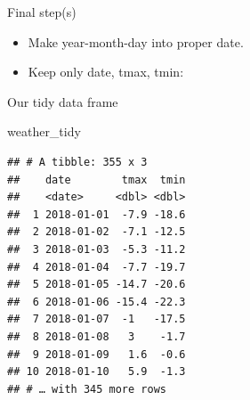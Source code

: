 \documentclass[
  ignorenonframetext,
]{beamer}
\newenvironment{Shaded}{\begin{snugshade}}{\end{snugshade}}
\newcommand{\DataTypeTok}[1]{\textcolor[rgb]{0.13,0.29,0.53}{#1}}
\newcommand{\KeywordTok}[1]{\textcolor[rgb]{0.13,0.29,0.53}{\textbf{#1}}}
\newcommand{\NormalTok}[1]{#1}
\newcommand{\OperatorTok}[1]{\textcolor[rgb]{0.81,0.36,0.00}{\textbf{#1}}}
\newcommand{\StringTok}[1]{\textcolor[rgb]{0.31,0.60,0.02}{#1}}
\providecommand{\tightlist}{%
  \setlength{\itemsep}{0pt}\setlength{\parskip}{0pt}}
\begin{document}
\begin{frame}[fragile]{Final step(s)}
\protect\hypertarget{final-steps}{}

\begin{itemize}
\tightlist
\item
  Make year-month-day into proper date.
\item
  Keep only date, tmax, tmin: \small
\end{itemize}

\begin{Shaded}
\end{Shaded}

\normalsize

\end{frame}

\begin{frame}[fragile]{Our tidy data frame}
\protect\hypertarget{our-tidy-data-frame}{}

\begin{Shaded}
\begin{Highlighting}[]
\NormalTok{weather_tidy}
\end{Highlighting}
\end{Shaded}

\begin{verbatim}
## # A tibble: 355 x 3
##    date        tmax  tmin
##    <date>     <dbl> <dbl>
##  1 2018-01-01  -7.9 -18.6
##  2 2018-01-02  -7.1 -12.5
##  3 2018-01-03  -5.3 -11.2
##  4 2018-01-04  -7.7 -19.7
##  5 2018-01-05 -14.7 -20.6
##  6 2018-01-06 -15.4 -22.3
##  7 2018-01-07  -1   -17.5
##  8 2018-01-08   3    -1.7
##  9 2018-01-09   1.6  -0.6
## 10 2018-01-10   5.9  -1.3
## # … with 345 more rows
\end{verbatim}

\end{frame}
\end{document}
